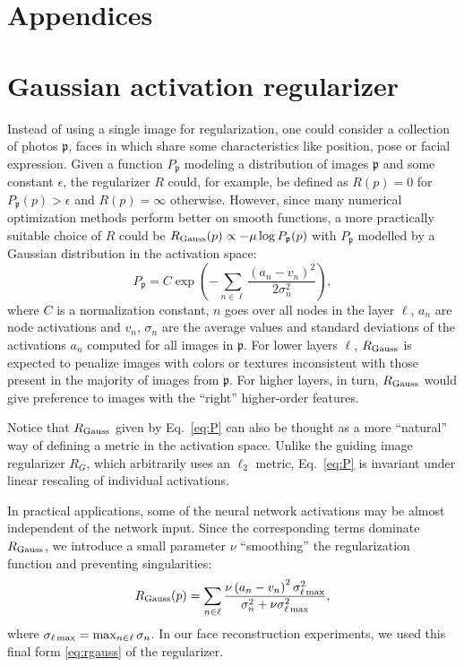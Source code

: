 \documentclass{article}
\def\Img{p}
\def\SetImgs{\mathfrak{p}}
\def\Reg{R}
\def\GReg{\Reg_G}
\def\RegGauss{\Reg_{\rm Gauss}}
\def\Act{a}
\def\Prob{P}
\def\Av{v}
\def\Dev{\sigma}
\newcommand{\Eq}[1]{Eq.~\eqref{#1}}
\newcommand{\omtnips}[1]{#1}
\begin{document}
\omtnips{
  \newpage
  \setcounter{secnumdepth}{0}
  \section{Appendices}
  \setcounter{secnumdepth}{1}
  \appendix

  \section{Gaussian activation regularizer}
  \label{sec:gaussian}

    Instead of using a single image for regularization, one could consider a collection of photos $\SetImgs$, faces in which share some characteristics like position, pose or facial expression.
    Given a function $\Prob_\SetImgs$ modeling a distribution of images $\SetImgs$ and some constant $\epsilon$, the regularizer $\Reg$ could, for example, be defined as $\Reg(\Img) = 0$ for $\Prob_\SetImgs(\Img) > \epsilon$ and $\Reg(\Img)=\infty$ otherwise.
    However, since many numerical optimization methods perform better on smooth functions, a more practically suitable choice of $\Reg$ could be $\RegGauss(\Img) \propto -\mu \log \Prob_\SetImgs(\Img)$ with $\Prob_\SetImgs$ modelled by a Gaussian distribution in the activation space:
    \begin{equation}
        \label{eq:P}
        \Prob_\SetImgs = C \exp\left(
            - \sum_{n\in \ell} \frac{(\Act_n - \Av_n)^2}{2\Dev^2_n}
        \right),
    \end{equation}
    where $C$ is a normalization constant, $n$ goes over all nodes in the layer $\ell$, $\Act_n$ are node activations and $\Av_n$, $\Dev_n$ are the average values and standard deviations of the activations $\Act_n$ computed for all images in $\SetImgs$.
    For lower layers $\ell$, $\RegGauss$ is expected to penalize images with colors or textures inconsistent with those present in the majority of images from $\SetImgs$.
    For higher layers, in turn, $\RegGauss$ would give preference to images with the ``right'' higher-order features.

    Notice that $\RegGauss$ given by \Eq{eq:P} can also be thought as a more ``natural'' way of defining a metric in the activation space.
    Unlike the guiding image regularizer $\GReg$, which arbitrarily uses an $\ell_2$ metric, \Eq{eq:P} is invariant under linear rescaling of individual activations.

    In practical applications, some of the neural network activations may be almost independent of the network input.
    Since the corresponding terms dominate $\RegGauss$, we introduce a small parameter $\nu$ ``smoothing'' the regularization function and preventing singularities:
    \begin{equation}
        \label{eq:rgauss}
        \RegGauss(\Img) = \sum_{n\in \ell} \frac{\nu \left( \Act_n - v_n \right)^2 \sigma_{\ell\,{\rm max}}^2}{\sigma_n^2 + \nu \sigma_{\ell\,{\rm max}}^2},
    \end{equation}
    where $\sigma_{\ell\,{\rm max}} = \max_{n\in \ell} \sigma_n$.
    In our face reconstruction experiments, we used this final form \eqref{eq:rgauss} of the regularizer.

}
\end{document}
